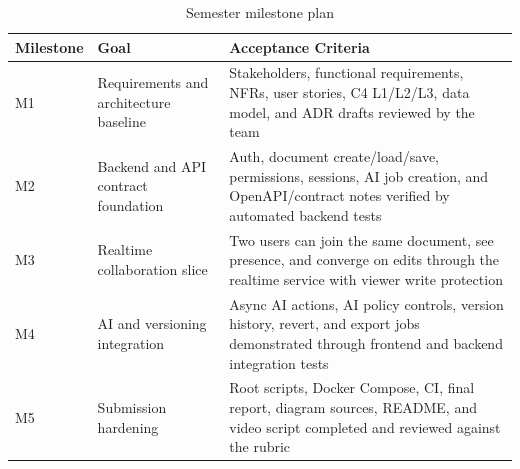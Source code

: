 \begin{table}[H]
\centering
\caption{Semester milestone plan}
\label{tab:milestones}
\begin{tabularx}{\textwidth}{p{2.1cm}p{4.2cm}X}
\toprule
\textbf{Milestone} & \textbf{Goal} & \textbf{Acceptance Criteria} \\
\midrule
M1 & Requirements and architecture baseline & Stakeholders, functional requirements, NFRs, user stories, C4 L1/L2/L3, data model, and ADR drafts reviewed by the team \\
M2 & Backend and API contract foundation & Auth, document create/load/save, permissions, sessions, AI job creation, and OpenAPI/contract notes verified by automated backend tests \\
M3 & Realtime collaboration slice & Two users can join the same document, see presence, and converge on edits through the realtime service with viewer write protection \\
M4 & AI and versioning integration & Async AI actions, AI policy controls, version history, revert, and export jobs demonstrated through frontend and backend integration tests \\
M5 & Submission hardening & Root scripts, Docker Compose, CI, final report, diagram sources, README, and video script completed and reviewed against the rubric \\
\bottomrule
\end{tabularx}
\end{table}
